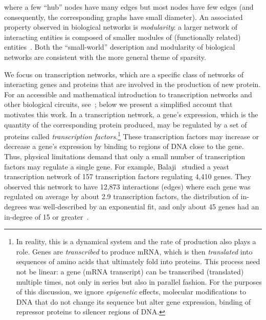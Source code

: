 where a few ``hub'' nodes have many edges but most nodes have few edges
(and consequently, the corresponding graphs have small diameter).
An associated property observed in biological networks is \emph{modularity}:
a larger network of interacting entities is composed of smaller modules of
(functionally related) entities~\cite{Hartwell:1999}.
Both the ``small-world'' description and modularity of biological networks are
consistent with the more general theme of sparsity.

We focus on transcription networks, which are a specific class of networks of
interacting genes and proteins that are involved in the production of new
protein. For an accessible and mathematical introduction to transcription
networks and other biological circuits, see~\cite{Alon:2006}; below we present a
simplified account that motivates this work.
In a transcription network, a gene's expression, which is the quantity of the
corresponding protein produced, may be regulated by a set of proteins called
\emph{transcription factors}.\footnote{In reality, this is a dynamical system
and the rate of production also plays a role.  Genes are \emph{transcribed} to
produce mRNA, which is then \emph{translated} into sequences of amino acids
that ultimately fold into proteins.  This process need not be linear:
a gene (mRNA transcript) can be transcribed (translated) multiple times,
not only in series but also in parallel fashion.  For the purposes of this
discussion, we ignore \emph{epigenetic} effects, \ie molecular modifications to
DNA that do not change its sequence but alter gene expression, \eg binding of
repressor proteins to silencer regions of DNA.} These transcription factors
may increase or decrease a gene's expression by binding to regions of DNA close
to the gene. Thus, physical limitations demand that only a small number of
transcription factors may regulate a single gene.  For example, Balaji
\etal~studied a yeast transcription network of 157 transcription factors regulating 
4,410 genes. They observed this network to have 12,873 interactions (edges) where
each gene was regulated on average by about 2.9 transcription factors, the
distribution of in-degrees was well-described by an exponential fit, and only
about 45 genes had an in-degree of 15 or greater~\cite{Balaji:2006}.

